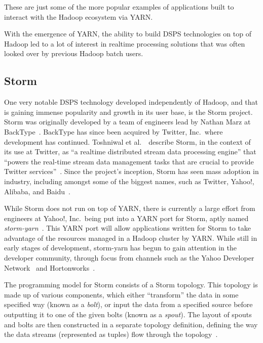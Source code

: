 These are just some of the more popular examples of applications built to interact with the Hadoop ecosystem via YARN.

With the emergence of YARN, the ability to build DSPS technologies on top of Hadoop led to a lot of interest in realtime
processing solutions that was often looked over by previous Hadoop batch users.



\subsection{Storm} %
\label{ssub:storm}

One very notable DSPS technology developed independently of Hadoop, and that is gaining immense popularity and growth in its
user base, is the Storm project. Storm was originally developed by a team of engineers lead by Nathan Marz at
BackType~\cite{web_storm}. BackType has since been acquired by Twitter, Inc.\ where development has
continued. Toshniwal et al.~\cite{toshniwal_stormtwitter_2014}\ describe Storm, in the context of its use at Twitter, as ``a
realtime distributed stream data processing engine'' that ``powers the real-time stream data management tasks that are
crucial to provide Twitter services''~\cite[p.\ 147]{toshniwal_stormtwitter_2014}. Since the project's inception, Storm has seen mass
adoption in industry, including amongst some of the biggest names, such as Twitter, Yahoo!, Alibaba, and
Baidu~\cite{storm_users}.

While Storm does not run on top of YARN, there is currently a large effort from engineers at Yahoo!, Inc.\ being put
into a YARN port for Storm, aptly named \textit{storm-yarn}~\cite{web_storm_yarn,kumar2014architectural}. This YARN port will
allow applications written for Storm to take advantage of the resources managed in a Hadoop cluster by YARN. While still
in early stages of development, storm-yarn has begun to gain attention in the developer community, through focus from
channels such as the Yahoo Developer Network~\cite{web_yahoo_blog} and Hortonworks~\cite{web_hortonworks_blog}.

The programming model for Storm consists of a Storm topology. This topology is made up of various components, which
either ``transform'' the data in some specified way (known as a \textit{bolt}), or input the data from a specified source
before outputting it to one of the given bolts (known as a \textit{spout}). The layout of spouts and bolts are then
constructed in a separate topology definition, defining the way the data streams (represented as tuples) flow through
the topology~\cite{jones2013process}.


